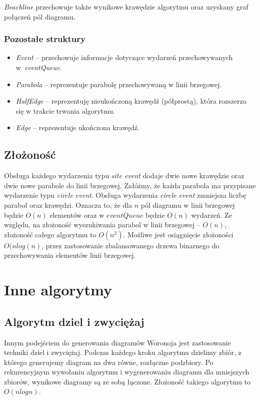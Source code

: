 \documentclass[declaration,shortabstract, inz]{iithesis}
\theoremstyle{definition} \newtheorem{definition}{Definicja}[]
\theoremstyle{plain} \newtheorem{remark}[definition]{Obserwacja}
\theoremstyle{plain} \newtheorem{theorem}[definition]{Twierdzenie}
\theoremstyle{plain} \newtheorem{example}{Przykład}[definition]
\theoremstyle{plain} \newtheorem{lemma}[definition]{Lemat}
\begin{document}
\textit{Beachline} przechowuje także wynikowe krawędzie algorytmu oraz uzyskany graf połączeń pól diagramu.

\subsubsection{Pozostałe struktury}
\begin{itemize}
	\item \textit{Event} -- przechowuje informacje dotyczące wydarzeń przechowywanych w~\textit{eventQueue}.
	\item \textit{Parabola} -- reprezentuje parabolę przechowywaną w linii brzegowej.
	\item \textit{HalfEdge} -- reprezentuję nieukończoną krawędź (półprostą), która rozszerza się w trakcie trwania algorytmu.
	\item \textit{Edge} -- reprezentuje ukończona krawędź.
\end{itemize}

\subsection{Złożoność}
Obsługa każdego wydarzenia typu \textit{site event} dodaje dwie nowe krawędzie oraz dwie nowe parabole do linii brzegowej. Załóżmy, że każda parabola ma przypisane wydarzenie typu \textit{circle event}. Obsługa wydarzenia \textit{circle event} zmniejsza liczbę parabol oraz krawędzi. Oznacza to, że dla $n$ pól diagramu w linii brzegowej będzie $O(n)$ elementów oraz w $eventQueue$ będzie $O(n)$ wydarzeń. Ze względu, na złożoność wyszukiwania parabol w linii brzegowej -- $O(n)$, złożoność całego algorytmu to $O(n^2)$. Możliwe jest osiągnięcie złożoności $O(nlog(n)$, przez zastosowanie zbalansowanego drzewa binarnego do przechowywania elementów linii brzegowej.


\section{Inne algorytmy}

\subsection{Algorytm dziel i zwyciężaj}

Innym podejściem do generowania diagramów Woronoja jest zastosowanie techniki dziel i zwyciężaj. Podczas każdego kroku algorytmu dzielimy zbiór, z którego generujemy diagram na dwa równe, rozłączne podzbiory. Po rekurencyjnym wywołaniu algorytmu i wygenerowaniu diagramu dla mniejszych zbiorów, wynikowe diagramy są ze sobą łączone. Złożoność takiego algorytmu to $O(nlogn)$.
\end{document}
